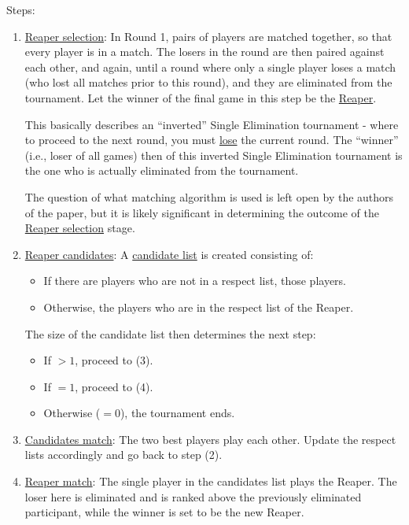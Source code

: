 \documentclass[a4,11pt,twoside,final,hidelinks]{article}
\begin{document}
Steps:
\begin{enumerate}
\item \uline{Reaper selection}: In Round 1, pairs of players are matched together, so that
every player is in a match. The losers in the round are then paired against
each other, and again, until a round where only a single player loses a match
(who lost all matches prior to this round), and they are eliminated from the
tournament. Let the winner of the final game in this step be the \uline{Reaper}.

This basically describes an ``inverted'' Single Elimination tournament - where
to proceed to the next round, you must \uline{lose} the current round. The ``winner''
(i.e., loser of all games) then of this inverted Single Elimination
tournament is the one who is actually eliminated from the tournament.

The question of what matching algorithm is used is left open by the authors
of the paper, but it is likely significant in determining the outcome of the
\uline{Reaper selection} stage.

\item \uline{Reaper candidates}: A \uline{candidate list} is created consisting of:
\begin{itemize}
\item If there are players who are not in a respect list, those players.
\item Otherwise, the players who are in the respect list of the Reaper.
\end{itemize}

The size of the candidate list then determines the next step:
\begin{itemize}
\item If \(> 1\), proceed to (3).
\item If \(= 1\), proceed to (4).
\item Otherwise (\(= 0\)), the tournament ends.
\end{itemize}

\item \uline{Candidates match}: The two best players play each other. Update the respect
lists accordingly and go back to step (2).

\item \uline{Reaper match}: The single player in the candidates list plays the Reaper. The
loser here is eliminated and is ranked above the previously eliminated
participant, while the winner is set to be the new Reaper.
\end{enumerate}
\end{document}
